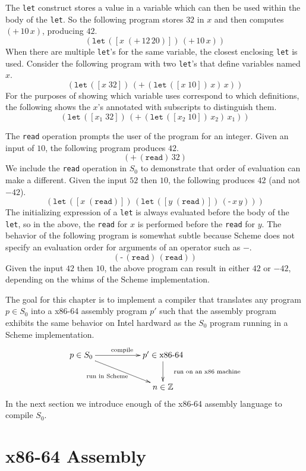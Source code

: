 \documentclass[10pt]{book}
\newcommand{\key}[1]{\texttt{#1}}
\newcommand{\READ}{(\key{read})}
\newcommand{\BINOP}[3]{(\key{#1}\,#2\,#3)}
\newcommand{\LET}[3]{(\key{let}\,([#1\;#2])\,#3)}
\begin{document}
The \key{let} construct stores a value in a variable which can then be
used within the body of the \key{let}. So the following program stores
$32$ in $x$ and then computes $\BINOP{+}{10}{x}$, producing $42$.
\[
\LET{x}{ \BINOP{+}{12}{20} }{ \BINOP{+}{10}{x} } 
\]
When there are multiple \key{let}'s for the same variable, the closest
enclosing \key{let} is used. Consider the following program with two
\key{let}'s that define variables named $x$.
\[
\LET{x}{32}{ \BINOP{+}{ \LET{x}{10}{x} }{ x } }
\]
For the purposes of showing which variable uses correspond to which
definitions, the following shows the $x$'s annotated with subscripts
to distinguish them.
\[
\LET{x_1}{32}{ \BINOP{+}{ \LET{x_2}{10}{x_2} }{ x_1 } }
\]

The \key{read} operation prompts the user of the program for an
integer. Given an input of $10$, the following program produces $42$.
\[
\BINOP{+}{(\key{read})}{32}
\]
We include the \key{read} operation in $S_0$ to demonstrate that order
of evaluation can make a different. Given the input $52$ then $10$,
the following produces $42$ (and not $-42$).
\[
\LET{x}{\READ}{ \LET{y}{\READ}{ \BINOP{-}{x}{y} } }
\]
The initializing expression of a \key{let} is always evaluated before
the body of the \key{let}, so in the above, the \key{read} for $x$ is
performed before the \key{read} for $y$.
%
The behavior of the following program is somewhat subtle because
Scheme does not specify an evaluation order for arguments of an
operator such as $-$.
\[
\BINOP{-}{\READ}{\READ}
\]
Given the input $42$ then $10$, the above program can result in either
$42$ or $-42$, depending on the whims of the Scheme implementation.

The goal for this chapter is to implement a compiler that translates
any program $p \in S_0$ into a x86-64 assembly program $p'$ such that
the assembly program exhibits the same behavior on Intel hardward as
the $S_0$ program running in a Scheme implementation.
\[
\xymatrix{
p \in S_0  \ar[rr]^{\text{compile}} \ar[drr]_{\text{run in Scheme}\quad}   &&  p' \in \text{x86-64} \ar[d]^{\quad\text{run on an x86 machine}}\\
& & n \in \mathbb{Z}   
}
\]
In the next section we introduce enough of the x86-64 assembly
language to compile $S_0$.

\section{x86-64 Assembly}
\end{document}
